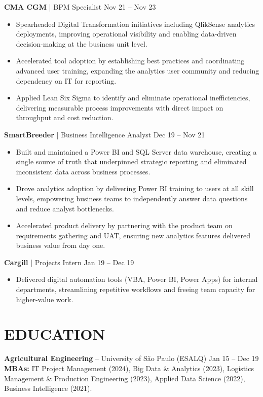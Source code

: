 \documentclass[9pt, letterpaper]{article}
\begin{document}
	\noindent \textbf{CMA CGM} | BPM Specialist \hfill Nov 21 -- Nov 23
	\begin{itemize}[noitemsep, topsep=1pt, leftmargin=1.5em, rightmargin=0.5cm]
		\item Spearheaded Digital Transformation initiatives including QlikSense analytics deployments, improving operational visibility and enabling data-driven decision-making at the business unit level.
		\item Accelerated tool adoption by establishing best practices and coordinating advanced user training, expanding the analytics user community and reducing dependency on IT for reporting.
		\item Applied Lean Six Sigma to identify and eliminate operational inefficiencies, delivering measurable process improvements with direct impact on throughput and cost reduction.
	\end{itemize}

	\noindent \textbf{SmartBreeder} | Business Intelligence Analyst \hfill Dec 19 -- Nov 21
	\begin{itemize}[noitemsep, topsep=1pt, leftmargin=1.5em, rightmargin=0.5cm]
		\item Built and maintained a Power BI and SQL Server data warehouse, creating a single source of truth that underpinned strategic reporting and eliminated inconsistent data across business processes.
		\item Drove analytics adoption by delivering Power BI training to users at all skill levels, empowering business teams to independently answer data questions and reduce analyst bottlenecks.
		\item Accelerated product delivery by partnering with the product team on requirements gathering and UAT, ensuring new analytics features delivered business value from day one.
	\end{itemize}

	\noindent \textbf{Cargill} | Projects Intern \hfill Jan 19 -- Dec 19
	\begin{itemize}[noitemsep, topsep=1pt, leftmargin=1.5em, rightmargin=0.5cm]
		\item Delivered digital automation tools (VBA, Power BI, Power Apps) for internal departments, streamlining repetitive workflows and freeing team capacity for higher-value work.
	\end{itemize}

	\section*{EDUCATION}
	\noindent \textbf{Agricultural Engineering} -- University of São Paulo (ESALQ) \hfill Jan 15 -- Dec 19 \\
	\noindent \textbf{MBAs:} IT Project Management (2024), Big Data \& Analytics (2023), Logistics Management \& Production Engineering (2023), Applied Data Science (2022), Business Intelligence (2021).
\end{document}
